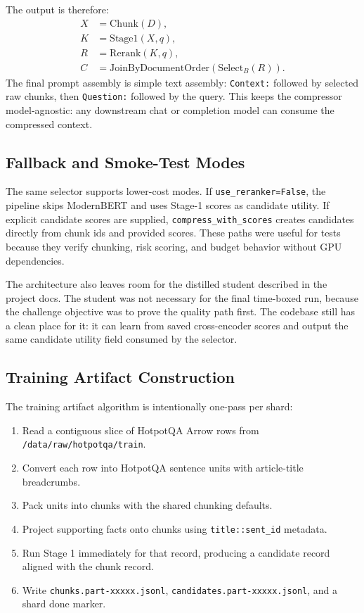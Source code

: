 \documentclass[10pt,twocolumn]{article}
\begin{document}
The output is therefore:
\[
\begin{aligned}
X &= \mathrm{Chunk}(D),\\
K &= \mathrm{Stage1}(X,q),\\
R &= \mathrm{Rerank}(K,q),\\
C &= \mathrm{JoinByDocumentOrder}(\mathrm{Select}_B(R)).
\end{aligned}
\]
The final prompt assembly is simple text assembly: \texttt{Context:} followed by selected raw chunks, then \texttt{Question:} followed by the query. This keeps the compressor model-agnostic: any downstream chat or completion model can consume the compressed context.

\subsection{Fallback and Smoke-Test Modes}
The same selector supports lower-cost modes. If \texttt{use\_reranker=False}, the pipeline skips ModernBERT and uses Stage-1 scores as candidate utility. If explicit candidate scores are supplied, \texttt{compress\_with\_scores} creates candidates directly from chunk ids and provided scores. These paths were useful for tests because they verify chunking, risk scoring, and budget behavior without GPU dependencies.

The architecture also leaves room for the distilled student described in the project docs. The student was not necessary for the final time-boxed run, because the challenge objective was to prove the quality path first. The codebase still has a clean place for it: it can learn from saved cross-encoder scores and output the same candidate utility field consumed by the selector.

\subsection{Training Artifact Construction}
The training artifact algorithm is intentionally one-pass per shard:
\begin{enumerate}
\item Read a contiguous slice of HotpotQA Arrow rows from \texttt{/data/raw/hotpotqa/train}.
\item Convert each row into HotpotQA sentence units with article-title breadcrumbs.
\item Pack units into chunks with the shared chunking defaults.
\item Project supporting facts onto chunks using \texttt{title::sent\_id} metadata.
\item Run Stage 1 immediately for that record, producing a candidate record aligned with the chunk record.
\item Write \texttt{chunks.part-xxxxx.jsonl}, \texttt{candidates.part-xxxxx.jsonl}, and a shard done marker.
\end{enumerate}
\end{document}
